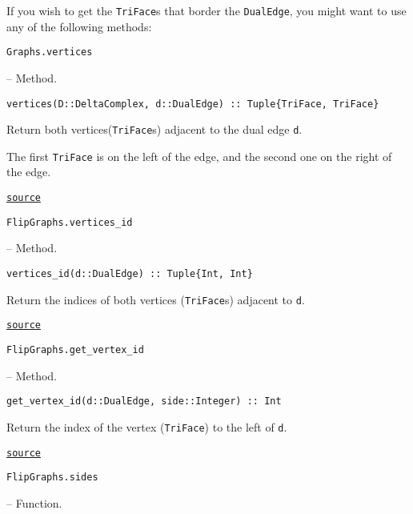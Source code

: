 If you wish to get the \texttt{TriFace}s that border the \texttt{DualEdge}, you might want to use any of the following methods:


\hypertarget{14467734776111556954}{\texttt{Graphs.vertices}}  -- {Method.}

\begin{adjustwidth}{2em}{0pt}


\begin{verbatim}
vertices(D::DeltaComplex, d::DualEdge) :: Tuple{TriFace, TriFace}
\end{verbatim}

Return both vertices(\texttt{TriFace}s) adjacent to the dual edge \texttt{d}.

The first \texttt{TriFace} is on the left of the edge, and the second one on the right of the edge.



\href{https://github.com/schto223/FlipGraphs.jl/blob/e35d43698a06b86273148826b79d585ba04fcd26/src/deltaComplex.jl#L299-L305}{\texttt{source}}


\end{adjustwidth}
\hypertarget{3945932976546166137}{\texttt{FlipGraphs.vertices\_id}}  -- {Method.}

\begin{adjustwidth}{2em}{0pt}


\begin{verbatim}
vertices_id(d::DualEdge) :: Tuple{Int, Int}
\end{verbatim}

Return the indices of both vertices (\texttt{TriFace}s) adjacent to \texttt{d}.



\href{https://github.com/schto223/FlipGraphs.jl/blob/e35d43698a06b86273148826b79d585ba04fcd26/src/deltaComplex.jl#L97-L101}{\texttt{source}}


\end{adjustwidth}
\hypertarget{2037339518078384361}{\texttt{FlipGraphs.get\_vertex\_id}}  -- {Method.}

\begin{adjustwidth}{2em}{0pt}


\begin{verbatim}
get_vertex_id(d::DualEdge, side::Integer) :: Int
\end{verbatim}

Return the index of the vertex (\texttt{TriFace}) to the left of \texttt{d}.



\href{https://github.com/schto223/FlipGraphs.jl/blob/e35d43698a06b86273148826b79d585ba04fcd26/src/deltaComplex.jl#L104-L108}{\texttt{source}}


\end{adjustwidth}
\hypertarget{4237288860456336970}{\texttt{FlipGraphs.sides}}  -- {Function.}

